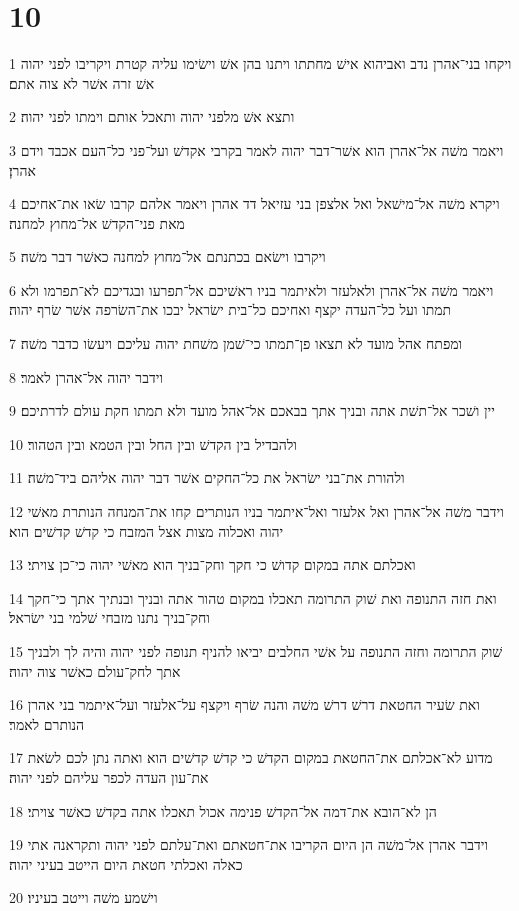 \chapter{10}

\par 1 ויקחו בני־אהרן נדב ואביהוא אישׁ מחתתו ויתנו בהן אשׁ וישׂימו עליה קטרת ויקריבו לפני יהוה אשׁ זרה אשׁר לא צוה אתם׃
\par 2 ותצא אשׁ מלפני יהוה ותאכל אותם וימתו לפני יהוה׃
\par 3 ויאמר משׁה אל־אהרן הוא אשׁר־דבר יהוה לאמר בקרבי אקדשׁ ועל־פני כל־העם אכבד וידם אהרן׃
\par 4 ויקרא משׁה אל־מישׁאל ואל אלצפן בני עזיאל דד אהרן ויאמר אלהם קרבו שׂאו את־אחיכם מאת פני־הקדשׁ אל־מחוץ למחנה׃
\par 5 ויקרבו וישׂאם בכתנתם אל־מחוץ למחנה כאשׁר דבר משׁה׃
\par 6 ויאמר משׁה אל־אהרן ולאלעזר ולאיתמר בניו ראשׁיכם אל־תפרעו ובגדיכם לא־תפרמו ולא תמתו ועל כל־העדה יקצף ואחיכם כל־בית ישׂראל יבכו את־השׂרפה אשׁר שׂרף יהוה׃
\par 7 ומפתח אהל מועד לא תצאו פן־תמתו כי־שׁמן משׁחת יהוה עליכם ויעשׂו כדבר משׁה׃
\par 8 וידבר יהוה אל־אהרן לאמר׃
\par 9 יין ושׁכר אל־תשׁת אתה ובניך אתך בבאכם אל־אהל מועד ולא תמתו חקת עולם לדרתיכם׃
\par 10 ולהבדיל בין הקדשׁ ובין החל ובין הטמא ובין הטהור׃
\par 11 ולהורת את־בני ישׂראל את כל־החקים אשׁר דבר יהוה אליהם ביד־משׁה׃
\par 12 וידבר משׁה אל־אהרן ואל אלעזר ואל־איתמר בניו הנותרים קחו את־המנחה הנותרת מאשׁי יהוה ואכלוה מצות אצל המזבח כי קדשׁ קדשׁים הוא׃
\par 13 ואכלתם אתה במקום קדושׁ כי חקך וחק־בניך הוא מאשׁי יהוה כי־כן צויתי׃
\par 14 ואת חזה התנופה ואת שׁוק התרומה תאכלו במקום טהור אתה ובניך ובנתיך אתך כי־חקך וחק־בניך נתנו מזבחי שׁלמי בני ישׂראל׃
\par 15 שׁוק התרומה וחזה התנופה על אשׁי החלבים יביאו להניף תנופה לפני יהוה והיה לך ולבניך אתך לחק־עולם כאשׁר צוה יהוה׃
\par 16 ואת שׂעיר החטאת דרשׁ דרשׁ משׁה והנה שׂרף ויקצף על־אלעזר ועל־איתמר בני אהרן הנותרם לאמר׃
\par 17 מדוע לא־אכלתם את־החטאת במקום הקדשׁ כי קדשׁ קדשׁים הוא ואתה נתן לכם לשׂאת את־עון העדה לכפר עליהם לפני יהוה׃
\par 18 הן לא־הובא את־דמה אל־הקדשׁ פנימה אכול תאכלו אתה בקדשׁ כאשׁר צויתי׃
\par 19 וידבר אהרן אל־משׁה הן היום הקריבו את־חטאתם ואת־עלתם לפני יהוה ותקראנה אתי כאלה ואכלתי חטאת היום הייטב בעיני יהוה׃
\par 20 וישׁמע משׁה וייטב בעיניו׃

